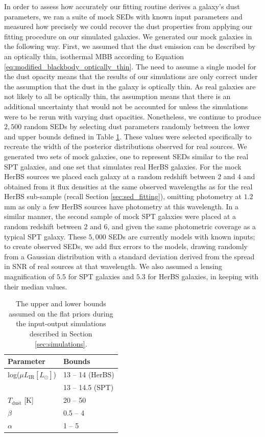In order to assess how accurately our fitting routine derives a galaxy's dust parameters, we ran a suite of mock SEDs with known input parameters and measured how precisely we could recover the dust properties from applying our fitting procedure on our simulated galaxies. We generated our mock galaxies in the following way. First, we assumed that the dust emission can be described by an optically thin, isothermal MBB according to Equation \ref{eq:modified_blackbody_optically_thin}. The need to assume a single model for the dust opacity means that the results of our simulations are only correct under the assumption that the dust in the galaxy is optically thin. As real galaxies are not likely to all be optically thin, ths assumption means that there is an additional uncertainty that would not be accounted for unless the simulations were to be rerun with varying dust opacities. Nonetheless, we continue to produce $2,500$ random SEDs by selecting dust parameters randomly between the lower and upper bounds defined in Table \ref{tab:simulation_inputs}. These values were selected specifically to recreate the width of the posterior distributions observed for real sources. We generated two sets of mock galaxies, one to represent SEDs similar to the real SPT galaxies, and one set that simulates real HerBS galaxies. For the mock HerBS sources we placed each galaxy at a random redshift between $2$ and $4$ and obtained from it flux densities at the same observed wavelengths as for the real HerBS sub-sample (recall Section \ref{sec:sed_fitting}), omitting photometry at $1.2\,$mm as only a few HerBS sources have photometry at this wavelength. In a similar manner, the second sample of mock SPT galaxies were placed at a random redshift between $2$ and $6$, and given the same photometric coverage as a typical SPT galaxy. These $5,000$ SEDs are currently models with known inputs; to create observed SEDs, we add flux errors to the models, drawing randomly from a Gaussian distribution with a standard deviation derived from the spread in SNR of real sources at that wavelength. We also assumed a lensing magnification of $5.5$ for SPT galaxies and $5.3$ for HerBS galaxies, in keeping with their median values.

\begin{table}
    \centering
    \begin{tabular}{p{3cm}|p{3cm}}
        \hline
		\hline
        Parameter & Bounds \\
        \hline
        \hline
        log($\mu L_{\textrm{IR}} [L_{\odot}]$) & 13 -- 14 (HerBS) \\
        & 13 -- 14.5 (SPT) \\
		$T_{\textrm{dust}}$ [K] & 20 -- 50 \\
		$\beta$  & 0.5 -- 4 \\
		$\alpha$  & 1 -- 5 \\
        \hline
    \end{tabular}
    \caption[Bounds on the input parameter ranges for mock galaxy simulations]{The upper and lower bounds assumed on the flat priors during the input-output simulations described in Section \ref{sec:simulations}.}
    \label{tab:simulation_inputs}
\end{table}

